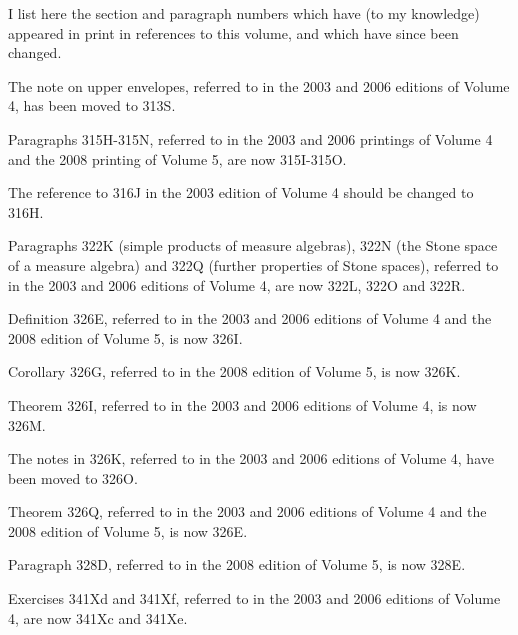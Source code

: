 
\def\chaptername{Concordance}
\def\sectionname{Concordance}

\gdef\bottomparagraph{Concordance}
\noindent{\bf\sectionname}
\smallskip
\let\headlinesectionname=\sectionname

I list here the section and paragraph numbers which have (to my knowledge) appeared in print in references to this volume, and which have since been changed.

\medskip

 The note on upper envelopes, referred to
in the 2003 and 2006 editions of Volume 4, has been moved to 313S.

 Paragraphs 3{}15H-3{}15N, referred to in the 2003 and
2006 printings of Volume 4 and the 2008 printing of Volume 5,
are now 315I-315O.
 
 The 
reference to 3{}16J in the 2003 edition of Volume 4 should be changed to 
316H.

 Paragraphs 3{}22K (simple products of measure algebras), 
3{}22N (the Stone space of a measure algebra) and 3{}22Q (further
properties of Stone spaces), referred to in
the 2003 and 2006 editions of Volume 4, are now 322L, 322O and 322R.

 Definition 3{}26E, 
referred to in the 2003 and 2006 
editions of Volume 4 and the 2008 edition of Volume 5, is now 326I.

 Corollary 3{}26G, referred to in the 2008 edition of Volume 5, 
is now 326K.

 Theorem 3{}26I, referred to in the 2003 and 2006 editions of Volume 4, 
is now 326M.

 The notes in 3{}26K, 
referred to in the 2003 and 2006 editions of Volume 4, 
have been moved to 326O.

 Theorem 3{}26Q, 
referred to in the 2003 and 2006 editions of Volume 4 and the 2008 edition of Volume 5,
is now 326E.

 Paragraph 3{}28D,
referred to in the 2008 edition of Volume 5, is now 328E.
 
 Exercises 3{}41Xd and 3{}41Xf, referred to in the 2003
and 2006 editions of Volume 4, are now 341Xc and 341Xe.

\frnewpage

